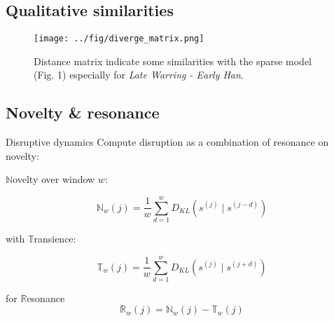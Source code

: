 \subsection{Qualitative similarities}
\begin{frame}
\begin{figure}
	\centering
	\texttt{[image: ../fig/diverge\_matrix.png]}
	\caption{Distance matrix indicate some similarities with the sparse model (Fig. 1) especially for \emph{Late Warring - Early Han}.}
\end{figure}
\end{frame}


{\nologo
\subsection{Novelty \& resonance}
\begin{frame}{Disruptive dynamics}
Compute disruption as a combination of resonance on novelty:

\medskip

$\mathbb{N}$ovelty over window $w$:

\begin{equation*}
	\mathbb{N}_w (j) =  \frac{1}{w} \sum_{d=1}^{w}  D_{KL} (s^{(j)} \mid s^{(j - d)})
\end{equation*}

with $\mathbb{T}$ransience:

\begin{equation*}
\mathbb{T}_w (j) =  \frac{1}{w} \sum_{d=1}^{w}  D_{KL} (s^{(j)} \mid s^{(j + d)})
\end{equation*}

for $\mathbb{R}$esonance
\begin{equation*}
\mathbb{R}_w (j) = \mathbb{N}_w (j) - \mathbb{T}_w (j)
\end{equation*}

\end{frame}
}


